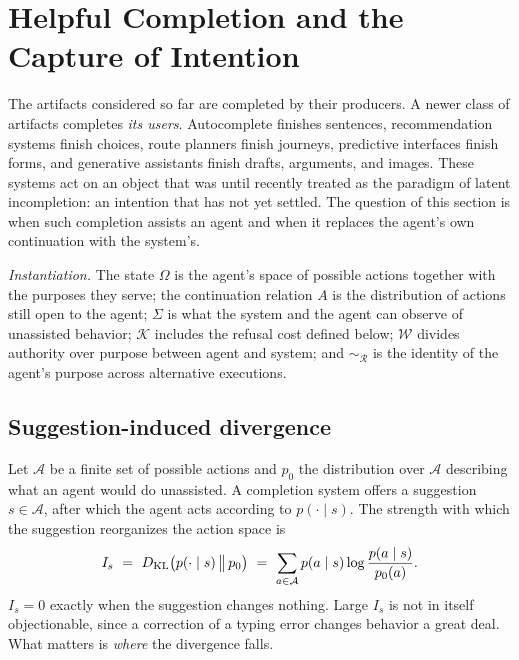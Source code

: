 \section{Helpful Completion and the Capture of Intention}\label{sec:assist}

The artifacts considered so far are completed by their producers. A newer class of artifacts completes \emph{its users}. Autocomplete finishes sentences, recommendation systems finish choices, route planners finish journeys, predictive interfaces finish forms, and generative assistants finish drafts, arguments, and images. These systems act on an object that was until recently treated as the paradigm of latent incompletion: an intention that has not yet settled. The question of this section is when such completion assists an agent and when it replaces the agent's own continuation with the system's.

\emph{Instantiation.} The state $\Omega$ is the agent's space of possible actions together with the purposes they serve; the continuation relation $A$ is the distribution of actions still open to the agent; $\Sigma$ is what the system and the agent can observe of unassisted behavior; $\mathcal{K}$ includes the refusal cost defined below; $\mathcal{W}$ divides authority over purpose between agent and system; and $\sim_{\mathcal{R}}$ is the identity of the agent's purpose across alternative executions.

\subsection{Suggestion-induced divergence}

Let $\mathcal{A}$ be a finite set of possible actions and $p_0$ the distribution over $\mathcal{A}$ describing what an agent would do unassisted. A completion system offers a suggestion $s\in\mathcal{A}$, after which the agent acts according to $p(\cdot\mid s)$. The strength with which the suggestion reorganizes the action space is
\begin{equation}\label{eq:Is}
I_s\ =\ \KL\big(p(\cdot\mid s)\,\big\|\,p_0\big)\ =\ \sum_{a\in\mathcal{A}}p(a\mid s)\log\frac{p(a\mid s)}{p_0(a)}.
\end{equation}
$I_s=0$ exactly when the suggestion changes nothing. Large $I_s$ is not in itself objectionable, since a correction of a typing error changes behavior a great deal. What matters is \emph{where} the divergence falls.

